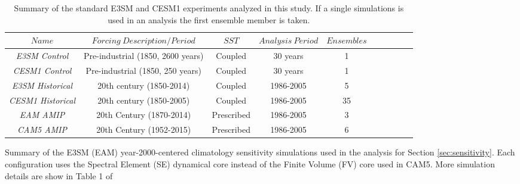 \documentclass[draft,ms]{AGUTeX}
\begin{document}
\begin{article}
\begin{table}[t]
\caption{Summary of the standard E3SM and CESM1 experiments analyzed in this study. If a single simulations is used in an analysis the first ensemble member is taken.}\label{tab:ctrl_sims}
\begin{center}
\begin{tabular}{cccccrrcrc}
\hline\hline
$Name$ & $Forcing\ Description/Period$ &$SST$ & $Analysis\ Period$ & $Ensembles$\\
\hline
\it{E3SM Control}     & Pre-industrial (1850, 2600 years)                          & Coupled     & 30 years  & 1 \\
\it{CESM1 Control}    & Pre-industrial (1850, 250 years)                           & Coupled     & 30 years  & 1 \\
\it{E3SM Historical}  & 20th century (1850-2014)                                   & Coupled     & 1986-2005 & 5  \\
\it{CESM1 Historical} & 20th century (1850-2005)                                   & Coupled     & 1986-2005 & 35 \\ 
\it{EAM AMIP}         & 20th Century (1870-2014)                                   & Prescribed  & 1986-2005 & 3 \\
\it{CAM5 AMIP}        & 20th Century (1952-2015)                                   & Prescribed  & 1986-2005 & 6 \\
\hline
\end{tabular}
\end{center}
\end{table}

\begin{table}[t]
\caption{Summary of the E3SM (EAM) year-2000-centered climatology sensitivity simulations used in the analysis for Section \ref{sec:sensitivity}. Each configuration uses the Spectral Element (SE) dynamical core instead of the Finite Volume (FV) core used in CAM5. More simulation details are show in Table 1 of \cite{Xie2018}} \label{tab:sens_sims}


\end{table}
\end{article}
\end{document}
